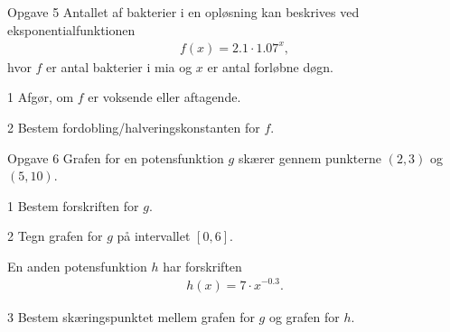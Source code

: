 \begin{opgavetekst}{Opgave 5}
	Antallet af bakterier i en opløsning kan beskrives ved eksponentialfunktionen
	\begin{align*}
		f(x) = 2.1\cdot 1.07^x,
	\end{align*}
	hvor $f$ er antal bakterier i mia og $x$ er antal forløbne døgn.
\end{opgavetekst}
\begin{delopgave}{}{1}
	Afgør, om $f$ er voksende eller aftagende.
\end{delopgave}
\begin{delopgave}{}{2}
	Bestem fordobling/halveringskonstanten for $f$.
\end{delopgave}

\begin{opgavetekst}{Opgave 6}
	Grafen for en potensfunktion $g$ skærer gennem punkterne $(2,3)$ og $(5,10)$. 
\end{opgavetekst}
\begin{delopgave}{}{1}
	Bestem forskriften for $g$.
\end{delopgave}	
\begin{delopgave}{}{2}
	Tegn grafen for $g$ på intervallet $[0,6]$.
\end{delopgave}	
\begin{meretekst}
	En anden potensfunktion $h$ har forskriften
	\begin{align*}
		h(x) = 7\cdot x^{-0.3}.
	\end{align*}
\end{meretekst}
\begin{delopgave}{}{3}
	Bestem skæringspunktet mellem grafen for $g$ og grafen for $h$. 
\end{delopgave}
	